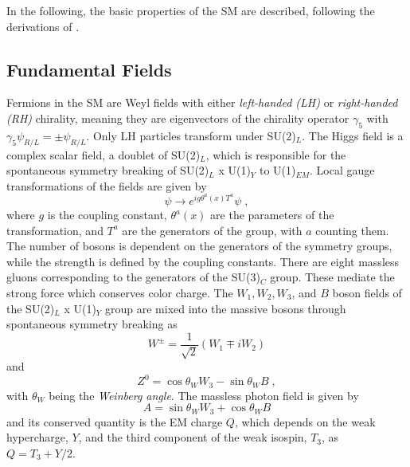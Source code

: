 In the following, the basic properties of the SM are described, following the derivations of .


\subsection{Fundamental Fields}

Fermions in the SM are Weyl fields with either \textit{left-handed (LH)} or \textit{right-handed (RH)} chirality, meaning they are eigenvectors of the chirality operator $\gamma_5$ with $\gamma_5 \psi_{R/L}=\pm \psi_{R/L}$. Only LH particles transform under SU(2)$_L$. The Higgs field is a complex scalar field, a doublet of SU(2)$_L$, which is responsible for the spontaneous symmetry breaking of SU(2)$_L$ x U(1)$_Y$ to U(1)$_{EM}$. Local gauge transformations of the fields are given by
\begin{equation}
    \psi \rightarrow e^{i g \theta^a(x) T^a} \psi
    \;,
\end{equation}
where $g$ is the coupling constant, $\theta^a(x)$ are the parameters of the transformation, and $T^a$ are the generators of the group, with $a$ counting them. The number of bosons is dependent on the generators of the symmetry groups, while the strength is defined by the coupling constants. There are eight massless gluons corresponding to the generators of the SU(3)$_C$ group. These mediate the strong force which conserves color charge. The $W_1, W_2, W_3$, and $B$ boson fields of the SU(2)$_L$ x U(1)$_Y$ group are mixed into the massive bosons through spontaneous symmetry breaking as
\begin{equation}
    W^\pm = \frac{1}{\sqrt{2}} (W_1 \mp i W_2)
\end{equation}
and
\begin{equation}
    Z^0 = \cos \theta_W W_3 - \sin \theta_W B
    \;,
\end{equation}
with $\theta_W$ being the \textit{Weinberg angle}. The massless photon field is given by
\begin{equation}
    A = \sin \theta_W W_3 + \cos \theta_W B
\end{equation}
and its conserved quantity is the EM charge $Q$, which depends on the weak hypercharge, $Y$, and the third component of the weak isospin, $T_3$, as $Q = T_3 + Y/2$.

